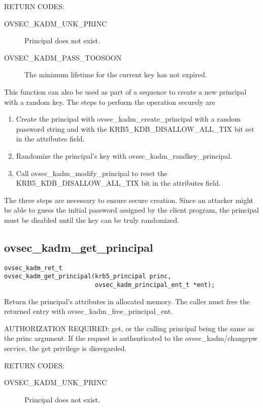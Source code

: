 RETURN CODES:

\begin{description}
\item[OVSEC_KADM_UNK_PRINC] Principal does not exist.
\item[OVSEC_KADM_PASS_TOOSOON] The minimum lifetime for the current
key has not expired.
\end{description}

This function can also be used as part of a sequence to create a new
principal with a random key.  The steps to perform the operation
securely are

\begin{enumerate}
\item Create the principal with ovsec_kadm_create_principal with a
random password string and with the KRB5_KDB_DISALLOW_ALL_TIX bit set
in the attributes field.

\item Randomize the principal's key with ovsec_kadm_randkey_principal.

\item Call ovsec_kadm_modify_principal to reset the
KRB5_KDB_DISALLOW_ALL_TIX bit in the attributes field.
\end{enumerate}

The three steps are necessary to ensure secure creation.  Since an
attacker might be able to guess the initial password assigned by the
client program, the principal must be disabled until the key can be
truly randomized.

\subsection{ovsec_kadm_get_principal}

\begin{verbatim}
ovsec_kadm_ret_t
ovsec_kadm_get_principal(krb5_principal princ, 
                         ovsec_kadm_principal_ent_t *ent);  
\end{verbatim}

Return the principal's attributes in allocated memory.  The caller
must free the returned entry with ovsec_kadm_free_principal_ent.

AUTHORIZATION REQUIRED: get, or the calling principal being the same
as the princ argument.  If the request is authenticated to the
ovsec_kadm/changepw service, the get privilege is disregarded.


RETURN CODES:

\begin{description}
\item[OVSEC_KADM_UNK_PRINC] Principal does not exist.
\end{description}

